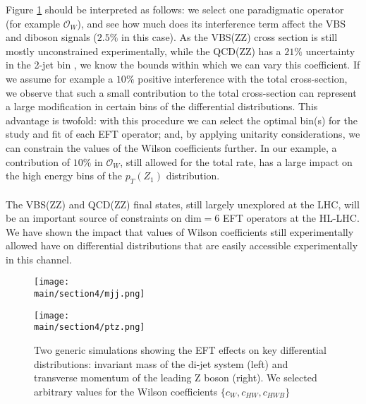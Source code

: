 \documentclass[../report.tex]{subfiles}
\providecommand{\main}{..}
\begin{document}
Figure \ref{fig:plots} should be interpreted as follows: we select one paradigmatic operator (for example $\mathcal{O}_W$), and see how much does its interference term affect the VBS and diboson signals ($2.5\%$ in this case). As the VBS(ZZ) cross section is still mostly unconstrained experimentally, while the QCD(ZZ) has a $21\%$ uncertainty in the 2-jet bin \cite{Sirunyan:2018vkx}, we know the bounds within which we can vary this coefficient. If we assume for example a $10 \%$ positive interference with the total cross-section, we observe that such a small contribution to the total cross-section can represent a large modification in certain bins of the differential distributions. This advantage is twofold: with this procedure we can select the optimal bin(s) for the study and fit of each EFT operator; and, by applying unitarity considerations, we can constrain the values of the Wilson coefficients further. In our example, a contribution of $10 \%$ in $\mathcal{O}_W$, still allowed for the total rate, has a large impact on the high energy bins of the $p_T (Z_1)$ distribution. 
\\
 
\\
The VBS(ZZ) and QCD(ZZ) final states, still largely unexplored at the LHC, will be an important source of constraints on $\mathrm{dim=6}$ EFT operators at the HL-LHC. We have shown the impact that values of Wilson coefficients still experimentally allowed have on differential distributions that are easily accessible experimentally in this channel. 

% 
\begin{figure}[htbp]
  \begin{minipage}[b]{0.5\textwidth}
    \texttt{[image: \\main/section4/mjj.png]}
  \end{minipage}
  \begin{minipage}[b]{0.5\textwidth}
    \texttt{[image: \\main/section4/ptz.png]}
  \end{minipage}
  \caption{Two generic simulations showing the EFT effects on key differential distributions: invariant mass of the di-jet system (left) and transverse momentum of the leading Z boson (right). We selected arbitrary values for the Wilson coefficients $\lbrace c_W, c_{HW}, c_{HWB} \rbrace$}
  \label{fig:plots}
\end{figure}
\end{document}
